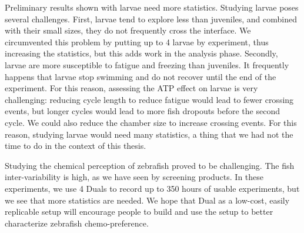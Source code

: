   Preliminary results shown with larvae need more statistics. Studying larvae poses several challenges. First, larvae tend to explore less than juveniles, and combined with their small sizes, they do not frequently cross the interface. We circumvented this problem by putting up to 4 larvae by experiment, thus increasing the statistics, but this adds work in the analysis phase. Secondly, larvae are more susceptible to fatigue and freezing than juveniles. It frequently happens that larvae stop swimming and do not recover until the end of the experiment.
For this reason, assessing the ATP effect on larvae is very challenging: reducing cycle length to reduce fatigue would lead to fewer crossing events, but longer cycles would lead to more fish dropouts before the second cycle. We could also reduce the chamber size to increase crossing events. For this reason, studying larvae would need many statistics, a thing that we had not the time to do in the context of this thesis.

  Studying the chemical perception of zebrafish proved to be challenging. The fish inter-variability is high, as we have seen by screening products. In these experiments, we use 4 Duals to record up to 350 hours of usable experiments, but we see that more statistics are needed. We hope that Dual as a low-cost, easily replicable setup will encourage people to build and use the setup to better characterize zebrafish chemo-preference.


